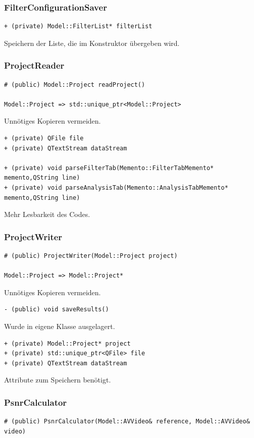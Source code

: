 \documentclass{scrartcl}
\begin{document}
{\subsubsection{FilterConfigurationSaver}
\begin{verbatim}
+ (private) Model::FilterList* filterList
\end{verbatim}
Speichern der Liste, die im Konstruktor übergeben wird.
\bigskip
\subsubsection{ProjectReader}
\bigskip
\begin{verbatim}
# (public) Model::Project readProject()

Model::Project => std::unique_ptr<Model::Project>
\end{verbatim}
Unnötiges Kopieren vermeiden.
\bigskip
\begin{verbatim}
+ (private) QFile file
+ (private) QTextStream dataStream

+ (private) void parseFilterTab(Memento::FilterTabMemento* memento,QString line)
+ (private) void parseAnalysisTab(Memento::AnalysisTabMemento* memento,QString line)
\end{verbatim}
Mehr Lesbarkeit des Codes.
\bigskip
\subsubsection{ProjectWriter}
\bigskip
\begin{verbatim}
# (public) ProjectWriter(Model::Project project)

Model::Project => Model::Project*
\end{verbatim}
Unnötiges Kopieren vermeiden.
\bigskip
\begin{verbatim}
- (public) void saveResults()
\end{verbatim}
Wurde in eigene Klasse ausgelagert.
\begin{verbatim}
+ (private) Model::Project* project
+ (private) std::unique_ptr<QFile> file
+ (private) QTextStream dataStream
\end{verbatim}
Attribute zum Speichern benötigt.
\newpage
\subsubsection{PsnrCalculator}
\bigskip
\begin{verbatim}
# (public) PsnrCalculator(Model::AVVideo& reference, Model::AVVideo& video)


\end{verbatim}}
\end{document}
